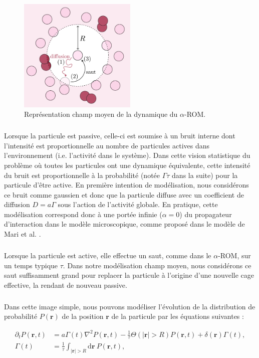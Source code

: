 \begin{figure}[h]
	\centering
	\includegraphics[width=0.5\textwidth]{Chapitre3/Figures/Interpretation/LHLModel.pdf}
	\caption{Représentation champ moyen de la dynamique du $\alpha$-ROM.}
	\label{fig:LHLmodel}
\end{figure}

\subparagraph{}Lorsque la particule est passive, celle-ci est soumise à un bruit interne dont l'intensité est proportionnelle au nombre de particules actives dans l'environnement (i.e. l'activité dans le système). Dans cette vision statistique du problème où toutes les particules ont une dynamique équivalente, cette intensité du bruit est proportionnelle à la probabilité (notée $\Gamma\tau$ dans la suite) pour la particule d'être active. En première intention de modélisation, nous considérons ce bruit comme gaussien et donc que la particule diffuse avec un coefficient de diffusion $D=a\Gamma$ sous l'action de l'activité globale. En pratique, cette modélisation correspond donc à une portée infinie ($\alpha = 0$) du propagateur d'interaction dans le modèle microscopique, comme proposé dans le modèle de Mari et al. \cite{mari_absorbing_2022}.

\subparagraph{}Lorsque la particule est active, elle effectue un saut, comme dans le $\alpha$-ROM, sur un temps typique $\tau$. Dans notre modélisation champ moyen, nous considérons ce saut suffisamment grand pour replacer la particule à l'origine d'une nouvelle cage effective, la rendant de nouveau passive. 

\subparagraph{}Dans cette image simple, nous pouvons modéliser l'évolution de la distribution de probabilité $P(\mathbf{r})$ de la position $\mathbf{r}$ de la particule par les équations suivantes :

\begin{equation}
\begin{aligned}
    \partial_t P(\mathbf{r}, t) &= a\Gamma (t)\nabla^2 P(\mathbf{r}, t) - \frac{1}{\tau}\Theta(|\mathbf{r}|>R)P(\mathbf{r}, t) + \delta(\mathbf{r})\Gamma (t),\\ \Gamma (t) &= \frac{1}{\tau}\int_{|\mathbf{r}|>R}\mathrm{d}\mathbf{r}~P(\mathbf{r}, t),
    \label{eq:muHLDiff}
\end{aligned}
\end{equation} 

